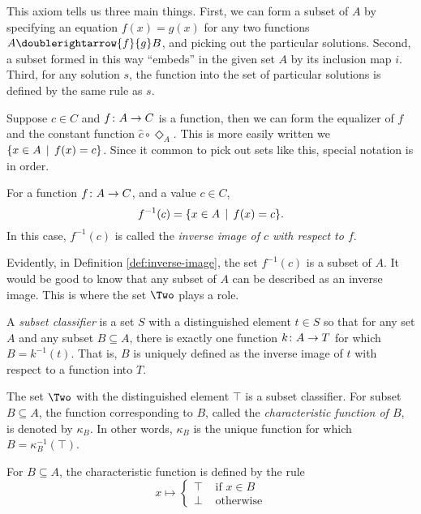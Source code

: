 This axiom tells us three main things.
First, we can form a subset of $A$ by specifying an equation $f(x)=g(x)$ for any two functions $A\doublerightarrow{f}{g}B$, and picking out the particular solutions.
Second, a subset formed in this way ``embeds'' in the given set $A$ by its inclusion map $i$.
Third, for any solution $s$, the function into the set of particular solutions is defined by the same rule as $s$.

Suppose $c\in C$ and ${f}\colon{A}\to{C}$ is a function, then we can form the equalizer of $f$ and the constant function $\hat{c}\circ\Diamond_A$.
This is more easily written we $\{x\in A\,\mid\, f(x)=c\}$.
Since it common to pick out sets like this, special notation is in order.

\begin{defn}\label{def:inverse-image}
	For a function ${f}\colon{A}\to{C}$, and a value $c\in C$, 
	\[f^{-1}(c) = \{x\in A\,\mid\, f(x)=c\}.\] 
	In this case, $f^{-1}(c)$ is called the \emph{inverse image of $c$ with respect to $f$}.
\end{defn}

Evidently, in Definition \ref{def:inverse-image}, the set $f^{-1}(c)$ is a subset of $A$.
It would be good to know that any subset of $A$ can be described as an inverse image.
This is where the set $\Two$ plays a role.

\begin{defn}\label{def:subset-classifier}
	A \emph{subset classifier} is a set $S$ with a distinguished element $t\in S$ so that for any set $A$ and any subset $B\subseteq A$, there is exactly one function ${k}\colon{A}\to{T}$ for which $B = k^{-1}(t)$.
	That is, $B$ is uniquely defined as the inverse image of $t$ with respect to a function into $T$.
\end{defn}

\begin{principle}\label{ax:subset-char}
	The set $\Two$ with the distinguished element $\top$ is a subset classifier.
	For subset $B\subseteq A$, the function corresponding to $B$, called the \emph{characteristic function of $B$}, is denoted by $\kappa_B$.
	In other words, $\kappa_B$ is the unique function for which $B = \kappa_B^{-1}(\top)$.

	For $B\subseteq A$, the characteristic function is defined by the rule
	\[
	x \mapsto
		\begin{cases}
			\top &\text{ if } x\in B\\
			\bot &\text{ otherwise}
		\end{cases}
	\]
\end{principle}


